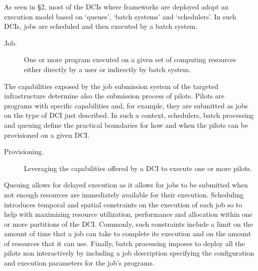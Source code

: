 \documentclass{sig-alternate}
\begin{document}
As seen in \S2, most of the DCIs where \pilotjobs frameworks are deployed adopt an execution model based on `queues', `batch systems' and `schedulers'. In such DCIs, jobs are scheduled and then executed by a batch system.

\begin{description}
  \item[Job.] One or more program executed on a given set of computing resources either directly by a user or indirectly by batch system.
\end{description}

 

  

 

The capabilities exposed by the job submission system of the targeted infrastructure determine also the submission process of pilots. Pilots are programs with specific capabilities and, for example, they are submitted as jobs on the type of DCI just described. In such a context, schedulers, batch processing and queuing define the practical boundaries for how and when the pilots can be provisioned on a given DCI. 

\begin{description}
  \item[Provisioning.] Leveraging the capabilities offered by a DCI to execute one or more pilots.  
\end{description}

Queuing allows for delayed execution as it allows for jobs to be submitted when not enough resources are immediately available for their execution. Scheduling introduces temporal and spatial constraints on the execution of each job so to help with maximizing resource utilization, performance and allocation within one or more partitions of the DCI. Commonly, such constraints include a limit on the amount of time that a job can take to complete its execution and on the amount of resources that it can use. Finally, batch processing imposes to deploy all the pilots non interactively by including a job description specifying the configuration and execution parameters for the job's programs.
\end{document}
